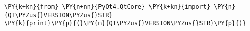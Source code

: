 \begin{Verbatim}[commandchars=\\\{\}]
\PY{k+kn}{from} \PY{n+nn}{PyQt4.QtCore} \PY{k+kn}{import} \PY{n}{QT\PYZus{}VERSION\PYZus{}STR}
\PY{k}{print}\PY{p}{(}\PY{n}{QT\PYZus{}VERSION\PYZus{}STR}\PY{p}{)}
\end{Verbatim}
